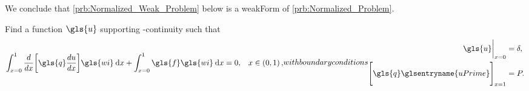 We conclude that \cref{prb:Normalized_Weak_Problem} below is a \gls{weakForm} of \cref{prb:Normalized_Problem}.
\begin{problem}	\label{prb:Normalized_Weak_Problem}
	Find a function $\gls{u}$ supporting -continuity such that
	\begin{subequations}
		\begin{align}	\label{eqn:Normalized_Weak_Diff_Eq}
			\int_{x = 0}^{1} \frac{d}{dx} \biggl[ \gls{q} \frac{du}{dx} \biggr] \gls{wi} \dd x
			+\int_{x = 0}^{1} \gls{f} \gls{wi} \dd x &= 0, & x \in \left( 0, 1 \right),
		\end{align}
		with boundary conditions
		\begin{align}
			\gls{u} \bigg \vert_{x = 0} &= \delta,  \label{eqn:Normalized_Weak_Left_Boundary} \\
			\Biggl[ \gls{q} \glsentryname{uPrime} \Biggr]_{x = 1} &= P. \label{eqn:Normalized_Weak_Right_Boundary}
		\end{align}
	\end{subequations}	
\end{problem}
